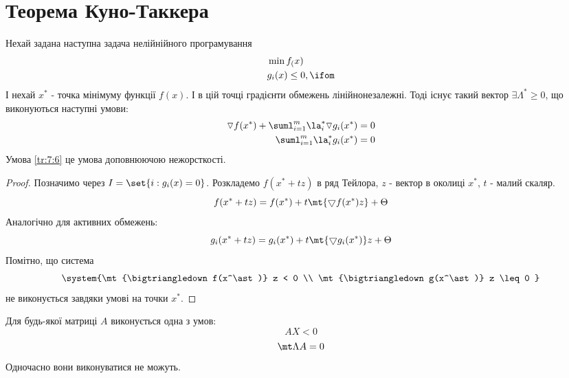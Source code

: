 \section{Теорема Куно-Таккера}
Нехай задана наступна задача нелійнійного програмування
\begin{eqnarray}
&\min f_(x)\label{tr:7:27}\\
&g_i(x)\leq 0,\ifom\label{tr:7:28}
\end{eqnarray}
І нехай $x^\ast$ - точка мінімуму функції $f(x)$. І в цій точці градієнти обмежень лінійнонезалежні. Тоді існує такий вектор $\exists \Lambda^\ast\geq 0$, що виконуються наступні умови:
\begin{eqnarray}
\triangledown f(x^\ast) + \suml_{i=1}^m \la_i^\ast \triangledown g_i(x^\ast) = 0\label{tr:7:26}\\
\suml_{i=1}^m \la_i^\ast g_i(x^\ast) = 0\label{tr:7:6}
\end{eqnarray}
Умова \eqref{tr:7:6} це умова доповнюючою нежорсткості.
\begin{proof}
Позначимо через $I=\set{i:g_i(x)=0}$. Розкладемо $f(x^\ast+tz)$ в ряд Тейлора, $z$ - вектор в околиці $x^\ast$, $t$ - малий скаляр.
\begin{equation}
	f(x^\ast+tz) = f(x^\ast) + t\mt{\bigtriangledown f(x^\ast) z} + \Theta
\end{equation}
Аналогічно для активних обмежень:
\begin{equation}
	g_i(x^\ast+tz) = g_i(x^\ast) + t \mt{\bigtriangledown g_i(x^\ast)} z + \Theta
\end{equation}
Помітно, що система 
\begin{equation}\label{tr:7:29}
	\system{\mt{\bigtriangledown f(x^\ast)} z < 0 \\ \mt{\bigtriangledown g(x^\ast)} z \leq 0 }
\end{equation}
не виконується завдяки умові на точки $x^*$. 
\end{proof}
\begin{teor}
Для будь-якої матриці $A$ виконується одна з умов: 
\begin{equation}
	AX < 0 
\end{equation}
\begin{equation}
	\mt\Lambda A = 0
\end{equation}
Одночасно вони виконуватися не можуть.
\end{teor}
